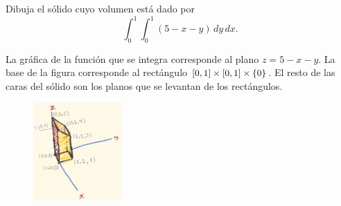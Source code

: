 Dibuja el sólido cuyo volumen está dado por 
\[
    \int_0^1 \int_0^1 ( 5-x-y ) \,dy\,dx.
\]
\begin{solution}
    La gráfica de la función que se integra corresponde al plano \( z=5-x-y \).
    La base de la figura corresponde al rectángulo \( [ 0,1 ] \times [ 0,1 ] \times \left\{ 0 \right\} \).
    El resto de las caras del sólido son los planos que se levantan de los rectángulos.
    \begin{figure}[H]
        \begin{center}
            \includegraphics[width=0.3\textwidth]{img/Ej3/ej5.png}
        \end{center}
    \end{figure}
\end{solution}
